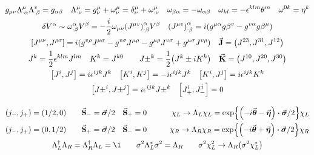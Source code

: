 \begin{gather*}
        g_{\mu\nu} \Lambda_{\cdot\alpha}^{\mu}\Lambda_{\cdot\beta}^{v} = g_{\alpha\beta}
        \quad
        \Lambda_{\cdot\nu}^{\mu} = g_{\nu}^{\mu} + \omega_{\nu}^{\mu} = \delta_{\nu}^{\mu} + \omega_{\cdot\nu}^{\mu}
        \quad
        \omega_{\beta\alpha}= -\omega_{\alpha\beta}
        \quad
        \omega_{kl} = -\epsilon^{klm} \theta^{m}
        \quad
        \omega^{0k} = \eta^{k}
        \\
        \delta V^{\alpha} \sim \omega_{\cdot\beta}^{\alpha} V^{\beta} = -\frac{i}{2} \omega_{\mu\nu}\qty(J^{\mu v})_{\cdot\beta}^{\alpha} V^{\beta}
        \quad
        \qty(J^{\mu v})_{\cdot\beta}^{\alpha} = i\qty(g^{\mu \alpha} g{\beta}^{v}-g^{v \alpha} g{\beta}^{\mu})
        \\
        \comm{J^{\mu \nu}}{J^{\rho \sigma}}
        = i\qty(g^{v \rho} J^{\mu \sigma}-g^{v \sigma} J^{\mu \rho}-g^{\mu \rho} J^{v \sigma}+g^{\mu \sigma} J^{v \rho})
        \quad
        \va{J} =\qty(J^{23}, J^{31}, J^{12})
        \\
        J^{k} =\frac{1}{2} \epsilon^{k l m} J^{l m}
        \quad
        K^{k} =J^{k 0}
        \qquad
        J{\pm}^{k}=\frac{1}{2}\qty(J^{k} \pm i K^{k})
        \quad
        \va{K} =\qty(J^{10}, J^{20}, J^{30})
        \\
        \comm{J^{i}}{J^{j}} =i \epsilon^{i j k} J^{k}
        \quad
        \comm{K^{i}}{K^{j}} =-i \epsilon^{i j k} J^{k}
        \quad
        \comm{K^{i}}{J^{j}} =i \epsilon^{i j k} K^{k}
        \\
        \comm{J{\pm}^{i}}{J{\pm}^{j}} = i \epsilon^{i j k} J{\pm}^{k}
        \quad
        \comm{J_{+}^{i}}{J_{-}^{j}} = 0
\end{gather*}

\begin{gather*}
        \begin{aligned}
        \qty(j_-,j_+)=\qty(1/2,0)
        &\qquad \va{S}_-=\va*{\sigma}/2\quad \va{S}_+=0
        &\qquad \chi_L\to\Lambda_L\chi_L=\exp{\qty(-i\va*{\theta}-\va*{\eta})\vdot\va*{\sigma}/2}\chi_L
        \\
        \qty(j_-,j_+)=\qty(0,1/2)
        &\qquad \va{S}_+=\va*{\sigma}/2\quad \va{S}_-=0
        &\qquad \chi_R\to\Lambda_R\chi_R=\exp{\qty(-i\va*{\theta}+\va*{\eta})\vdot\va*{\sigma}/2}\chi_R
        \end{aligned}
        \\
        \Lambda_L^\dagger\Lambda_R
        = \Lambda_R^\dagger\Lambda_L
        = \1
        \qquad
        \sigma^2\Lambda_L^*\sigma^2
        = \Lambda_R
        \qquad
        \sigma^2\chi_L^2
        \to\Lambda_R\qty(\sigma^2 \chi_L^*)
\end{gather*}
